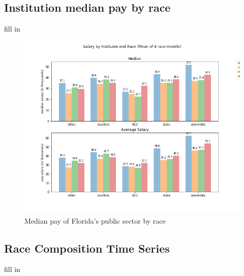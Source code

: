 \subsection{Institution median pay by race}
fill in


\begin{figure}[H]
\begin{center}
\includegraphics[width=5.5in]{Figures/race_median_pay}
\caption{Median pay of Florida's public sector by race }
\label{styleResponse}
\end{center}
\end{figure}

\subsection{Race Composition Time Series}
fill in


